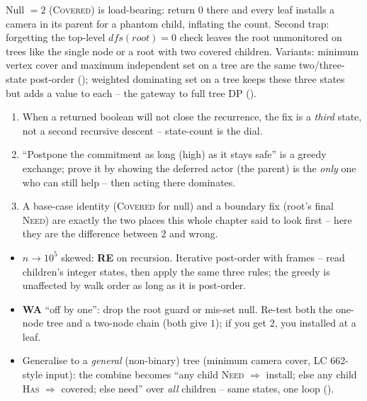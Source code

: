 \begin{warningbox}
Null $=2$ (\textsc{Covered}) is load-bearing: return $0$ there and every leaf installs
a camera in its parent for a phantom child, inflating the count. Second trap: forgetting
the top-level $\mathit{dfs}(\mathit{root}){=}0$ check leaves the root unmonitored on
trees like the single node or a root with two covered children. Variants: minimum vertex
cover and maximum independent set on a tree are the same two/three-state post-order
(); weighted dominating set on a tree keeps these three states but adds
a value to each -- the gateway to full tree DP ().
\end{warningbox}

\begin{insightbox}
\begin{enumerate}[nosep, leftmargin=1.6em]
  \item When a returned boolean will not close the recurrence, the fix is a
        \emph{third} state, not a second recursive descent -- state-count is the dial.
  \item ``Postpone the commitment as long (high) as it stays safe'' is a greedy
        exchange; prove it by showing the deferred actor (the parent) is the \emph{only}
        one who can still help -- then acting there dominates.
  \item A base-case identity (\textsc{Covered} for null) and a boundary fix (root's
        final \textsc{Need}) are exactly the two places this whole chapter said to look
        first -- here they are the difference between $2$ and wrong.
\end{enumerate}
\end{insightbox}

\begin{hardeningbox}
\begin{itemize}[nosep, leftmargin=1.4em]
  \item $n\to10^{5}$ skewed: \textbf{RE} on recursion. Iterative post-order with
         frames -- read children's integer states, then apply the
        same three rules; the greedy is unaffected by walk order as long as it is
        post-order.
  \item \textbf{WA} ``off by one'': drop the root guard or mis-set null. Re-test both
        the one-node tree and a two-node chain (both give $1$); if you get $2$, you
        installed at a leaf.
  \item Generalise to a \emph{general} (non-binary) tree (minimum camera cover, LC
        662-style input): the combine becomes ``any child \textsc{Need} $\Rightarrow$ install;
        else any child \textsc{Has} $\Rightarrow$ covered; else need'' over \emph{all}
        children -- same states, one loop ().
\end{itemize}
\end{hardeningbox}

